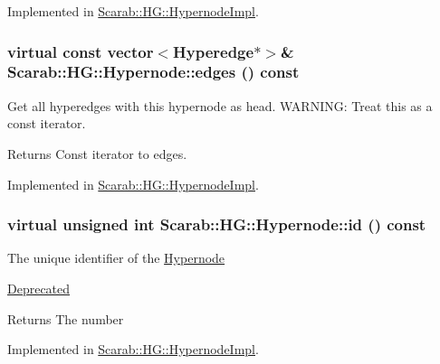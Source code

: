 Implemented in \hyperlink{class_scarab_1_1_h_g_1_1_hypernode_impl_a328189f28a4185d435035686a27592c2}{Scarab::HG::HypernodeImpl}.

\hypertarget{class_scarab_1_1_h_g_1_1_hypernode_a3306572ded5b5061c1916bcf268be94e}{
\subsubsection[{edges}]{\setlength{\rightskip}{0pt plus 5cm}virtual const vector$<${\bf Hyperedge}$\ast$$>$\& Scarab::HG::Hypernode::edges () const}}
\label{class_scarab_1_1_h_g_1_1_hypernode_a3306572ded5b5061c1916bcf268be94e}
Get all hyperedges with this hypernode as head. WARNING: Treat this as a const iterator. \begin{DoxyReturn}{Returns}
Const iterator to edges. 
\end{DoxyReturn}


Implemented in \hyperlink{class_scarab_1_1_h_g_1_1_hypernode_impl_ada979dcddc1bf0abf0fc2530d1ea8761}{Scarab::HG::HypernodeImpl}.

\hypertarget{class_scarab_1_1_h_g_1_1_hypernode_a0aeaee6c2ca2a011fcd086f803aaa4d0}{
\subsubsection[{id}]{\setlength{\rightskip}{0pt plus 5cm}virtual unsigned int Scarab::HG::Hypernode::id () const}}
\label{class_scarab_1_1_h_g_1_1_hypernode_a0aeaee6c2ca2a011fcd086f803aaa4d0}
The unique identifier of the \hyperlink{class_scarab_1_1_h_g_1_1_hypernode}{Hypernode} \begin{Desc}
\item[\hyperlink{deprecated__deprecated000006}{Deprecated}]\end{Desc}
\begin{DoxyReturn}{Returns}
The number 
\end{DoxyReturn}


Implemented in \hyperlink{class_scarab_1_1_h_g_1_1_hypernode_impl_a2579ef1e67ad8f51d23838c130440d21}{Scarab::HG::HypernodeImpl}.

